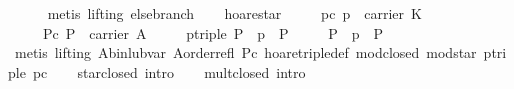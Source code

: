 \begin{isabellebody}
\ \ \ \ \isamarkupfalse%
\ {}metis\ {}lifting{}\ else{}branch{}%
\endisatagproof
{\isafoldproof}%
%
\isadelimproof
\isanewline
%
\endisadelimproof
\isanewline
\ \ \isamarkupfalse%
\ hoare{}star{}\isanewline
\ \ \ \ \ pc{}\ {}p\ {}\ carrier\ K{}\isanewline
\ \ \ \ \ Pc{}\ {}P\ {}\ carrier\ A{}\isanewline
\ \ \ \ \ p{}triple{}\ {}P\ {}\ p\ {}\ P{}\isanewline
\ \ \ \ \ {}P\ {}\ p\ {}\ P{}\isanewline
%
\isadelimproof
\ \ \ \ %
\endisadelimproof
%
\isatagproof
{}\isamarkupfalse%
\ {}metis\ {}lifting{}\ A{}bin{}lub{}var\ A{}order{}refl\ Pc\ hoare{}triple{}def\ mod{}closed\ mod{}star\ p{}triple\ pc{}%
\endisatagproof
{\isafoldproof}%
%
\isadelimproof
\isanewline
%
\endisadelimproof
\isanewline
\ \ \isamarkupfalse%
\ star{}closed\ {}intro{}\isanewline
\ \ \isamarkupfalse%
\ mult{}closed\ {}intro{}\isanewline

\end{isabellebody}
